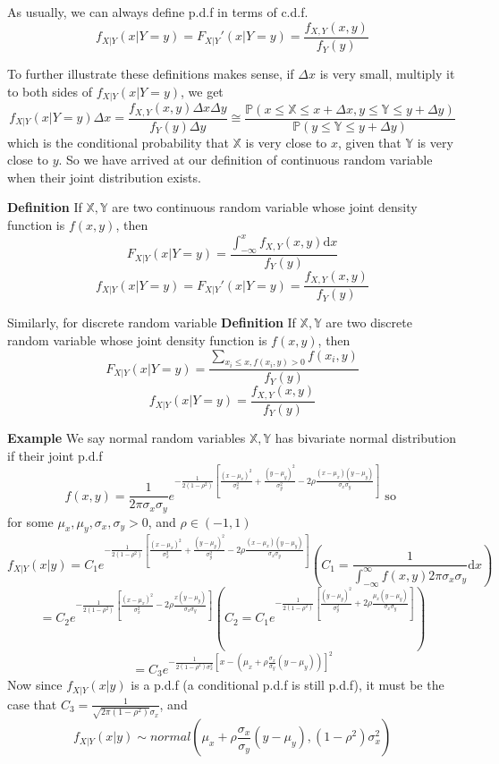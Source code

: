 \documentclass[a4paper,12pt]{article}
\begin{document}
As usually, we can always define p.d.f in terms of c.d.f. 
$$f_{X|Y}(x|Y=y) = F_{X|Y}'(x|Y=y) = \frac{f_{X,Y}(x, y)}{f_Y(y)}$$

To further illustrate these definitions makes sense, if $\Delta x$ is very small, multiply it to both sides of $f_{X|Y}(x|Y=y)$, we get
$$f_{X|Y}(x|Y=y)\Delta x = \frac{f_{X,Y}(x, y)\Delta x\Delta y}{f_Y(y)\Delta y} \cong \frac{\mathbb{P}(x \leq \mathbb{X} \leq x + \Delta x, y \leq \mathbb{Y} \leq y + \Delta y)}{\mathbb{P}( y \leq \mathbb{Y} \leq y + \Delta y )}$$ 
which is the conditional probability that $\mathbb{X}$ is very close to $x$, given that $\mathbb{Y}$ is very close to $y$. So we have arrived at our definition of continuous random variable when their joint distribution exists. 

\textbf{Definition} If $\mathbb{X}, \mathbb{Y}$ are two continuous random variable whose joint density function is $f(x,y)$, then
$$F_{X|Y}(x|Y=y) = \frac{\int_{-\infty}^x f_{X,Y}(x, y) \mathrm{d}x}{f_Y(y)}$$
$$f_{X|Y}(x|Y=y) = F_{X|Y}'(x|Y=y) = \frac{f_{X,Y}(x, y)}{f_Y(y)}$$

Similarly, for discrete random variable
\textbf{Definition} If $\mathbb{X}, \mathbb{Y}$ are two discrete random variable whose joint density function is $f(x,y)$, then
$$F_{X|Y}(x|Y=y) = \frac{\sum_{x_i \leq x, f(x_i, y)>0} f(x_i, y)}{f_Y(y)}$$
$$f_{X|Y}(x|Y=y) = \frac{f_{X,Y}(x, y)}{f_Y(y)}$$

\textbf{Example} We say normal random variables $\mathbb{X}, \mathbb{Y}$ has bivariate normal distribution if their joint p.d.f
$$f(x, y) = \frac{1}{2\pi\sigma_x\sigma_y}e^{ -\frac{1}{2(1-\rho^2)} [\frac{(x-\mu_x)^2}{\sigma^2_x} + \frac{(y-\mu_y)^2}{\sigma^2_y} - 2\rho\frac{(x-\mu_x)(y-\mu_y)}{\sigma_x\sigma_y}]} \text{ so }$$
for some $\mu_x, \mu_y, \sigma_x, \sigma_y > 0$, and $\rho \in (-1, 1)$
$$f_{X|Y}(x|y) = C_1 e^{ -\frac{1}{2(1-\rho^2)} [\frac{(x-\mu_x)^2}{\sigma^2_x} + \frac{(y-\mu_y)^2}{\sigma^2_y} - 2\rho\frac{(x-\mu_x)(y-\mu_y)}{\sigma_x\sigma_y}]} (C_1 = \frac{1}{\int_{-\infty}^\infty f(x, y) 2\pi\sigma_x\sigma_y} \mathrm{d}x)$$
$$= C_2 e^{ -\frac{1}{2(1-\rho^2)} [\frac{(x-\mu_x)^2}{\sigma^2_x} - 2\rho\frac{x(y-\mu_y)}{\sigma_x\sigma_y}] } (C_2 = C_1 e^{-\frac{1}{2(1-\rho^2)} [ \frac{(y-\mu_y)^2}{\sigma^2_y} + 2\rho\frac{\mu_x(y-\mu_y)}{\sigma_x\sigma_y}]})$$
$$= C_3 e^{-\frac{1}{2(1-\rho^2)\sigma^2_x} [x-(\mu_x + \rho\frac{\sigma_x}{\sigma_y}(y-\mu_y))]^2}$$
Now since $f_{X|Y}(x|y)$ is a p.d.f (a conditional p.d.f is still p.d.f), it must be the case that $C_3 = \frac{1}{\sqrt{2\pi(1-\rho^2)}\sigma_x}$, and $$f_{X|Y}(x|y) \sim normal( \mu_x + \rho\frac{\sigma_x}{\sigma_y}(y-\mu_y), (1-\rho^2)\sigma^2_x )$$
\end{document}

